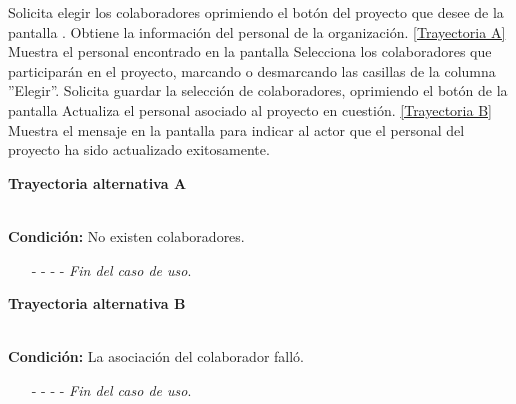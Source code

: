 	\begin{UCtrayectoria}
		\UCpaso[\UCactor] Solicita elegir los colaboradores oprimiendo el botón  del proyecto que desee de la pantalla .
		\UCpaso[\UCsist] Obtiene la información del personal de la organización. \hyperlink{CU4-1:TAA}{[Trayectoria A]}
		\UCpaso[\UCsist] Muestra el personal encontrado en la pantalla 
		\UCpaso[\UCactor] Selecciona los colaboradores que participarán en el proyecto, marcando o desmarcando las casillas de la columna ''Elegir''.
		\UCpaso[\UCactor] Solicita guardar la selección de colaboradores, oprimiendo el botón  de la pantalla 
		\UCpaso[\UCsist] Actualiza el personal asociado al proyecto en cuestión. \hyperlink{CU4-1:TAB}{[Trayectoria B]}
		\UCpaso[\UCsist] Muestra el mensaje  en la pantalla  para indicar al actor que el personal del proyecto ha sido actualizado exitosamente.
	\end{UCtrayectoria}		
	\hypertarget{CU4-1:TAA}{\textbf{Trayectoria alternativa A}}\\
	\noindent \textbf{Condición:} No existen colaboradores.
	\begin{enumerate}
		\UCpaso[\UCsist] Muestra el mensaje  en la pantalla  para indicar que no hay registros para mostrar.
		\item[- -] - - {\em {Fin del caso de uso}}.%
	\end{enumerate}

\hypertarget{CU4-1:TAB}{\textbf{Trayectoria alternativa B}}\\
\noindent \textbf{Condición:} La asociación del colaborador falló.
\begin{enumerate}
	\UCpaso[\UCsist] Muestra el mensaje  en la pantalla  para indicar que ocurrió un error al asociar a los colaboradores.
	\item[- -] - - {\em {Fin del caso de uso}}.%
\end{enumerate}
	
